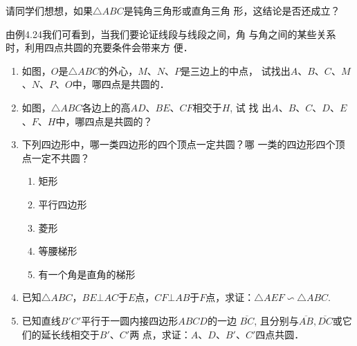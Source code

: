 请同学们想想，如果$\triangle ABC$是钝角三角形或直角三角
形，这结论是否还成立？

由例4.24我们可看到，当我们要论证线段与线段之间，角
与角之间的某些关系时，利用四点共圆的充要条件会带来方
便．

\begin{ex}
\begin{enumerate}
  \item 如图，$O$是$\triangle ABC$的外心，$M$、$N$、$P$是三边上的中点，
  试找出$A$、$B$、$C$、$M$、$N$、$P$、$O$中，哪四点是共圆的．

  \item  如图，$\triangle ABC$各边上的高$AD$、$BE$、$CF$相交于$H$, 试
  找
  出$A$、$B$、$C$、$D$、$E$、$F$、$H$中，哪四点是共圆的？
  \item 下列四边形中，哪一类四边形的四个顶点一定共圆？哪
  一类的四边形四个顶点一定不共圆？
\begin{multicols}{2}
  \begin{enumerate}
    \item 矩形
    \item 平行四边形
    \item 菱形
    \item 等腰梯形
    \item 有一个角是直角的梯形
  \end{enumerate}
\end{multicols}
  \item 已知$\triangle ABC$，$BE\bot AC$于$E$点，$CF\bot AB$于$F$点，求证：$\triangle AEF\backsim \triangle ABC$.
  \item 已知直线$B'C'$平行于一圆内接四边形$ABCD$的一边
  $\overline{BC}$, 且分别与$\overline{AB},\overline{DC}$或它们的延长线相交于$B'$、$C'$两
  点，求证：$A$、$D$、$B'$、$C'$四点共圆．
\end{enumerate}
\end{ex}

